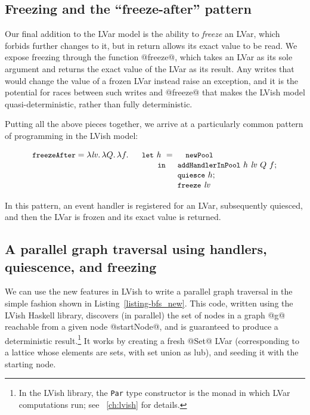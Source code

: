 \subsection{Freezing and the ``freeze-after'' pattern}\label{subsection:quasi-freeze-after}

Our final addition to the LVar model is the ability to \emph{freeze}
an LVar, which forbids further changes to it, but in return allows its
exact value to be read.  We expose freezing through the function
@freeze@, which takes an LVar as its sole argument and returns the
exact value of the LVar as its result.  Any writes that would change
the value of a frozen LVar instead raise an exception, and it is the
potential for races between such writes and @freeze@ that makes the
LVish model quasi-deterministic, rather than fully deterministic.

Putting all the above pieces together, we arrive at a particularly
common pattern of programming in the LVish model:

\vspace{-8mm}
\singlespacing
\[
\begin{array}[t]{l}
  \termfont{freezeAfter} = \lam{\mathit{lv}}{\lam{Q}{\lam{f}{}}}
  \begin{array}[t]{l}
    \termfont{let}~\mathit{h}~=~\NEWPOOL \\
    \letspace \termfont{in}
      \begin{array}[t]{l}  
        \ADDHANDLERINPOOL~h~\mathit{lv}~Q~f;
\\
        \QUIESCE~h;
\\
        \FREEZE~\mathit{lv}
      \end{array}
  \end{array}
\end{array}
\]
\doublespacing

\noindent In this pattern, an event handler is registered for an LVar,
subsequently quiesced, and then the LVar is frozen and its exact value
is returned.

\subsection{A parallel graph traversal using handlers, quiescence, and freezing}\label{subsection:quasi-parallel-graph-traversal}

We can use the new features in LVish to write a parallel graph
traversal in the simple fashion shown in
Listing~\ref{listing-bfs_new}.  This code, written using the LVish
Haskell library, discovers (in parallel) the set of nodes in a graph
@g@ reachable from a given node @startNode@, and is guaranteed to
produce a deterministic result.\footnote{In the LVish library, the
  \lstinline|Par| type constructor is the monad in which LVar
  computations run; see ~\ref{ch:lvish} for
  details.}  It works by creating a fresh @Set@ LVar (corresponding to
a lattice whose elements are sets, with set union as lub), and seeding
it with the starting node.

